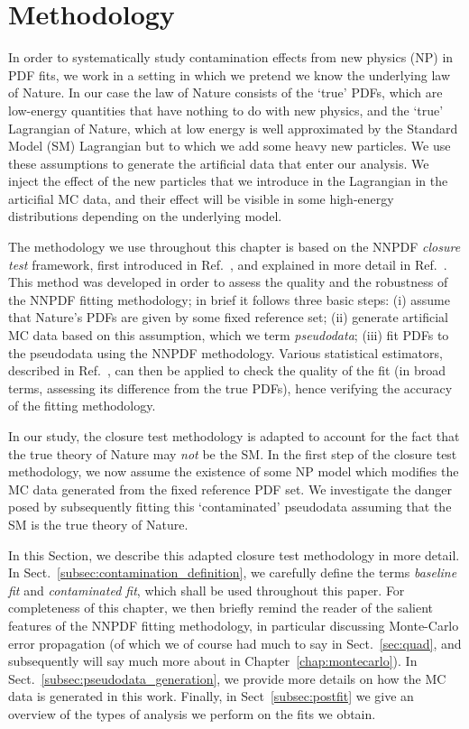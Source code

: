 \documentclass[withindex,glossary]{cam-thesis}
\begin{document}
\section{Methodology}
\label{sec:methodology}

In order to systematically study contamination effects from new physics (NP) in PDF fits, we work in a setting in which we pretend
we know the underlying law of Nature. In our case the law of Nature consists of the `true'
PDFs, which are low-energy quantities that have nothing to do with new physics, and the `true'
Lagrangian of Nature, which at low energy is well approximated by the Standard Model (SM) 
Lagrangian but to which we add some heavy new particles.
We use these assumptions to generate the artificial data that enter our analysis.
We inject the effect of the new particles that we introduce in the Lagrangian in the articifial MC data, and their effect 
will be visible in some high-energy distributions depending on the underlying model. 

The methodology we use throughout this chapter is based on the NNPDF \textit{closure test} framework,
first introduced in Ref.~\cite{NNPDF:2014otw}, and explained in more detail in Ref.~\cite{DelDebbio:2021whr}.
This method was developed
in order to assess the quality and the robustness of the NNPDF fitting methodology; in brief it follows three basic steps: (i) assume that Nature's PDFs
are given by some fixed reference set; (ii) generate artificial MC data based on this assumption, which we term \textit{pseudodata}; 
(iii) fit PDFs to the pseudodata using the NNPDF methodology. Various statistical estimators, described in Ref.~\cite{DelDebbio:2021whr}, can then be applied to 
check the quality of the fit (in broad terms, assessing its difference from the true PDFs), hence verifying the accuracy of the fitting methodology.

In our study, the closure test methodology is adapted to account for the fact that the true theory of Nature may \textit{not} be the 
SM. In the first step of the closure test methodology, we now assume the existence of some NP model which modifies
the MC data generated from the fixed reference PDF set. We investigate the danger posed by subsequently fitting this `contaminated' 
pseudodata assuming that the SM is the true theory of Nature.

In this Section, we describe this adapted closure test methodology in more detail. 
In Sect.~\ref{subsec:contamination_definition}, we carefully define the terms \textit{baseline fit} and \textit{contaminated fit}, 
which shall be used throughout this paper. For completeness of this chapter, we then briefly remind the reader of the salient features of the NNPDF fitting methodology, in particular discussing 
Monte-Carlo error propagation (of which we of course had much to say in Sect.~\ref{sec:quad}, and subsequently will say much more about in Chapter~\ref{chap:montecarlo}). In Sect.~\ref{subsec:pseudodata_generation}, we provide more details on how the MC data is generated in this work. 
Finally, in Sect~\ref{subsec:postfit} we give an overview of the types of analysis we perform on the fits we obtain.
\end{document}
